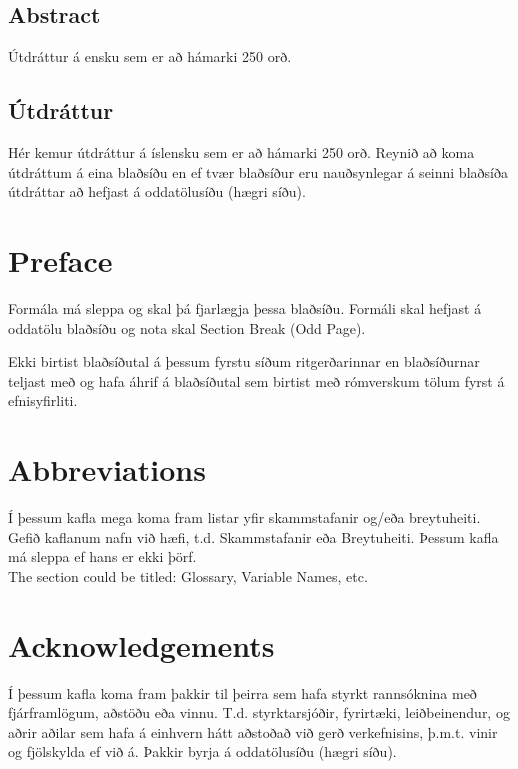 \documentclass[a4paper,12pt,twoside,BCOR=10mm]{scrbook}
\begin{document}

\setcounter{page}{5}
\section*{\huge Abstract}
Útdráttur á ensku sem er að hámarki 250 orð.
\vfill \vspace*{1cm}

\section*{\huge Útdráttur}
Hér kemur útdráttur á íslensku sem er að hámarki 250 orð. Reynið að koma útdráttum á eina blaðsíðu en ef tvær blaðsíður eru nauðsynlegar á seinni blaðsíða útdráttar að hefjast á oddatölusíðu (hægri síðu).
\vfill

\newpage

\chapter*{Preface}
Formála má sleppa og skal þá fjarlægja þessa blaðsíðu. Formáli skal hefjast á oddatölu blaðsíðu og nota skal Section Break (Odd Page).

Ekki birtist blaðsíðutal á þessum fyrstu síðum ritgerðarinnar en blaðsíðurnar teljast með og hafa áhrif á blaðsíðutal sem birtist með rómverskum tölum fyrst á efnisyfirliti.

\tableofcontents
\listoffigures
\listoftables

\chapter*{Abbreviations}
Í þessum kafla mega koma fram listar yfir skammstafanir og/eða breytuheiti. Gefið kaflanum nafn við hæfi, t.d. Skammstafanir eða Breytuheiti. Þessum kafla má sleppa ef hans er ekki þörf. \\

The section could be titled: Glossary, Variable Names, etc.

\chapter*{Acknowledgements}
Í þessum kafla koma fram þakkir til þeirra sem hafa styrkt rannsóknina með fjárframlögum, aðstöðu eða vinnu. T.d. styrktarsjóðir, fyrirtæki, leiðbeinendur, og aðrir aðilar sem hafa á einhvern hátt aðstoðað við gerð verkefnisins, þ.m.t. vinir og fjölskylda ef við á. Þakkir byrja á oddatölusíðu (hægri síðu).
\end{document}
